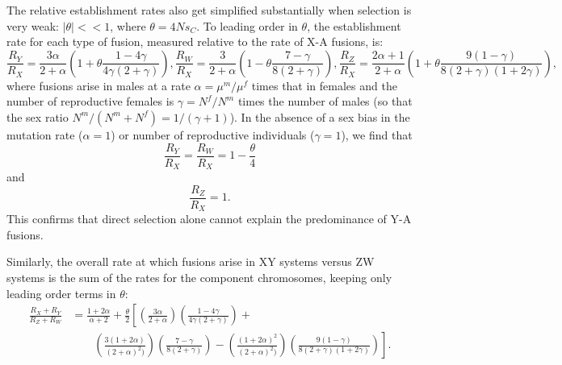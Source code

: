The relative establishment rates also get simplified substantially when selection is very weak: $|\theta| << \text{1}$, where $\theta=\text{4}Ns_C$. To leading order in $\theta$, the establishment rate for each type of fusion, measured relative to the rate of X-A fusions, is:
\begin{subequations}
\begin{equation}
\frac{R_Y}{R_X} = \frac{\text{3}\alpha}{\text{2} +\alpha} \left(\text{1} + \theta \frac{\text{1} - \text{4}\gamma}{\text{4}\gamma(\text{2}+\gamma)} \right),
\end{equation}
\begin{equation}
\frac{R_W}{R_X} = \frac{\text{3}}{\text{2} +\alpha} \left(\text{1} - \theta \frac{\text{7} - \gamma}{\text{8}(\text{2}+\gamma)} \right),
\end{equation}
\begin{equation}
\frac{R_Z}{R_X} = \frac{\text{2}\alpha + \text{1}}{\text{2} +\alpha} \left(\text{1} + \theta \frac{\text{9}(\text{1} - \gamma)}{\text{8}(\text{2}+\gamma)(\text{1}+\text{2}\gamma)} \right),
\end{equation}
\end{subequations}
where fusions arise in males at a rate $\alpha=\mu^m/\mu^f$ times that in females and the number of reproductive females is $\gamma=N^f/N^m$ times the number of males (so that the sex ratio $N^m/(N^m + N^f) = \text{1}/(\gamma + 1)$). In the absence of a sex bias in the mutation rate ($\alpha=\text{1}$) or number of reproductive individuals ($\gamma=\text{1}$), we find that 
\[\frac{R_Y}{R_X}=\frac{R_W}{R_X}=\text{1} - \frac{\theta}{\text{4}} \]
and 
\[\frac{R_Z}{R_X} = \text{1}.\]
This confirms that direct selection alone cannot explain the predominance of Y-A fusions. 

Similarly, the overall rate at which fusions arise in XY systems versus ZW systems is the sum of the rates for the component chromosomes, keeping only leading order terms in $\theta$:
\begin{align}
\frac{R_X + R_Y}{R_Z + R_W} &= \frac{\text{1}+\text{2}\alpha}{\alpha + \text{2}} 
+ \frac{\theta}{\text{2}} \left[ \left(\frac{\text{3}\alpha}{\text{2} + \alpha} \right)
\left(\frac{\text{1}-\text{4}\gamma}{\text{4}\gamma(\text{2}+\gamma)}\right) +  \right. \nonumber \\
&\qquad \left.
\left(\frac{\text{3}(\text{1}+\text{2}\alpha)}{(\text{2}+\alpha)^\text{2})} \right)
\left(\frac{\text{7}-\gamma}{\text{8}(\text{2}+\gamma)} \right) - 
\left(\frac{(\text{1}+\text{2}\alpha)^\text{2}}{(\text{2}+\alpha)^\text{2})} \right)
\left(\frac{\text{9}(\text{1}-\gamma)}{\text{8}(\text{2}+\gamma)(\text{1}+\text{2}\gamma)} \right) \right].
\end{align}

